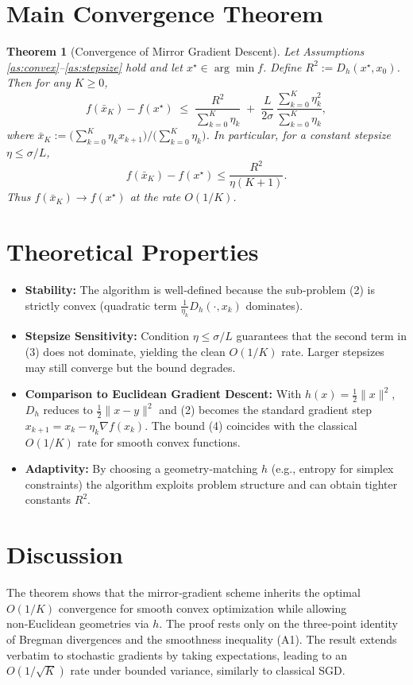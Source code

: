 \documentclass[11pt]{article}
\newtheorem{theorem}{Theorem}
\newcommand{\grad}{\nabla}
\newcommand{\D}{D_{h}}
\begin{document}
\section*{Main Convergence Theorem}
\begin{theorem}[Convergence of Mirror Gradient Descent]\label{thm:conv}
Let Assumptions \ref{as:convex}--\ref{as:stepsize} hold and let $x^{\star}\in\arg\min f$. 
Define $R^{2}:=\D(x^{\star},x_{0})$. Then for any $K\ge0$,
\[
\boxed{
f(\bar{x}_{K})-f(x^{\star})
\;\le\;
\frac{R^{2}}{\displaystyle\sum_{k=0}^{K}\eta_{k}}
\;+\;
\frac{L}{2\sigma}\,\frac{\displaystyle\sum_{k=0}^{K}\eta_{k}^{2}}
{\displaystyle\sum_{k=0}^{K}\eta_{k}},
}
\tag{3}
\]
where $\bar{x}_{K}:=\big(\sum_{k=0}^{K}\eta_{k}x_{k+1}\big)/\big(\sum_{k=0}^{K}\eta_{k}\big)$.  
In particular, for a constant stepsize $\eta\le\sigma/L$,
\[
f(\bar{x}_{K})-f(x^{\star})\le\frac{R^{2}}{\eta (K+1)}.
\tag{4}
\]
Thus $f(\bar{x}_{K})\to f(x^{\star})$ at the rate $O(1/K)$.
\end{theorem}

\section*{Theoretical Properties}
\begin{itemize}
\item \textbf{Stability:} The algorithm is well‑defined because the sub‑problem (2) is strictly convex (quadratic term $\frac{1}{\eta_{k}}\D(\cdot,x_{k})$ dominates).  
\item \textbf{Stepsize Sensitivity:} Condition $\eta\le\sigma/L$ guarantees that the second term in (3) does not dominate, yielding the clean $O(1/K)$ rate. Larger stepsizes may still converge but the bound degrades.  
\item \textbf{Comparison to Euclidean Gradient Descent:} With $h(x)=\tfrac12\|x\|^{2}$, $\D$ reduces to $\tfrac12\|x-y\|^{2}$ and (2) becomes the standard gradient step $x_{k+1}=x_{k}-\eta_{k}\grad f(x_{k})$. The bound (4) coincides with the classical $O(1/K)$ rate for smooth convex functions.  
\item \textbf{Adaptivity:} By choosing a geometry‑matching $h$ (e.g., entropy for simplex constraints) the algorithm exploits problem structure and can obtain tighter constants $R^{2}$.
\end{itemize}

\section*{Discussion}
The theorem shows that the mirror‑gradient scheme inherits the optimal $O(1/K)$ convergence for smooth convex optimization while allowing non‑Euclidean geometries via $h$. The proof rests only on the three‑point identity of Bregman divergences and the smoothness inequality (A1). The result extends verbatim to stochastic gradients by taking expectations, leading to an $O(1/\sqrt{K})$ rate under bounded variance, similarly to classical SGD.
\end{document}
